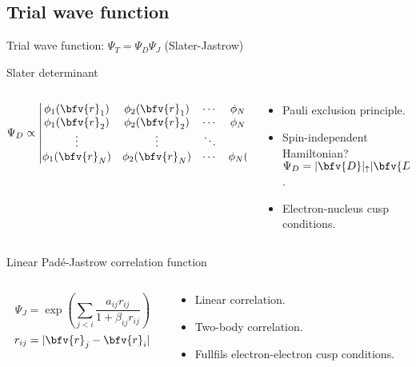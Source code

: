 \subsection{Trial wave function}
\begin{frame}{Trial wave function: $\Psi_T = \Psi_D \Psi_J$ (Slater-Jastrow)}
	\begin{scriptsize}
		\begin{alertblock}{Slater determinant}
			\begin{columns}
				\begin{column}{0.35\textwidth}
					$$
					\Psi_D \propto %
					\begin{vmatrix}
					\phi_1(\bfv{r}_1) & \phi_2(\bfv{r}_1) & \cdots & \phi_N(\bfv{r}_1)\\
					\phi_1(\bfv{r}_2) & \phi_2(\bfv{r}_2) & \cdots & \phi_N(\bfv{r}_2)\\
					\vdots  & \vdots & \ddots & \vdots  \\
					\phi_1(\bfv{r}_N) & \phi_2(\bfv{r}_N) & \cdots & \phi_N(\bfv{r}_N)  
					\end{vmatrix}
					$$
				\end{column}
								
				\begin{column}{0.45\textwidth}
					\begin{itemize}
						\item Pauli exclusion principle.
						\item Spin-independent Hamiltonian?\\$\Psi_D = |\bfv{D}|_{\uparrow} |\bfv{D}|_{\downarrow}$.
						\item Electron-nucleus cusp conditions.
				\end{itemize}
				\end{column}
			\end{columns}
		\end{alertblock}	
		
		\begin{alertblock}{Linear Pad\'e-Jastrow correlation function}
			\begin{columns}
				\begin{column}{0.35\textwidth}
					$$
					\Psi_{J} = \exp\left(\sum\limits_{j<i}\frac{a_{ij}r_{ij}}{1 + \beta_{ij}r_{ij}}\right)
					$$
					$$
					r_{ij} = |\bfv{r}_j - \bfv{r}_i| 
					$$
				\end{column}
								
				\begin{column}{0.45\textwidth}
					\begin{itemize}
						\item Linear correlation.
						\item Two-body correlation.
						\item Fullfils electron-electron cusp conditions.
				\end{itemize}
				\end{column}
			\end{columns}
		\end{alertblock}	
	\end{scriptsize}
\end{frame}



